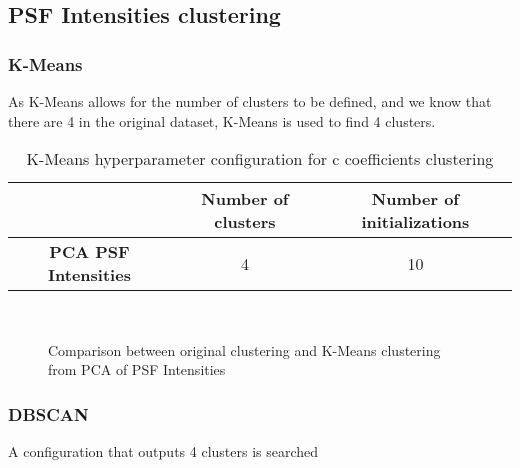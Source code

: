 	\subsection{PSF Intensities clustering}

		\subsubsection{K-Means}
			
			As K-Means allows for the number of clusters to be defined, and we know that there are 4 in the original dataset, K-Means is used to find 4 clusters.
			
			\begin{table}[h!]
				\centering
				\begin{tabular}{|c|c|c|}
					\hline
					& \textbf{Number of clusters} & \textbf{Number of initializations}\\
					\hline
					\textbf{PCA PSF Intensities} & 4 & 10\\
					\hline
				\end{tabular}
				\caption{K-Means hyperparameter configuration for c coefficients clustering}
			\end{table}
		
			\begin{figure*}[ht!]
				\centering
				\hspace{\fill}
				\\
					
				\hspace{\fill}
				\caption{Comparison between original clustering and K-Means clustering from PCA of PSF Intensities}
			\end{figure*}
			\FloatBarrier
		
		\subsubsection{DBSCAN}
			
			A configuration that outputs 4 clusters is searched
			

